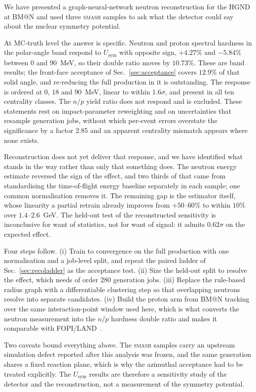 \documentclass[aps,prc,twocolumn,superscriptaddress,showpacs,%
               nofootinbib,floatfix,longbibliography]{revtex4-2}
\makeatletter
\newcommand{\Usym}{U_{\text{sym}}}
\newcommand{\HGND}{HGND}
\newcommand{\BMN}{BM@N}
\newcommand{\SMASH}{\textsc{smash}}
\makeatother
\begin{document}
We have presented a graph-neural-network neutron reconstruction for the
\HGND{} at \BMN{} and used three \SMASH{} samples to ask what the
detector could say about the nuclear symmetry potential.

At MC-truth level the answer is specific.  Neutron and proton spectral
hardness in the polar-angle band respond to $\Usym{}$ with opposite
sign, $+4.27\%$ and $-5.84\%$ between $0$ and $90$~MeV, so their double
ratio moves by $10.73\%$.  These are band results; the front-face
acceptance of Sec.~\ref{sec:acceptance} covers $12.9\%$ of that solid
angle, and re-reducing the full production in it is outstanding.  The response is ordered at $0$, $18$ and
$90$~MeV, linear to within $1.6\sigma$, and present in all ten
centrality classes.  The $n/p$ yield ratio does not respond and is
excluded.  These statements rest on impact-parameter reweighting and on
uncertainties that resample generation jobs, without which per-event
errors overstate the significance by a factor 2.85 and an apparent
centrality mismatch appears where none exists.

Reconstruction does not yet deliver that response, and we have
identified what stands in the way rather than only that something does.
The neutron energy estimate reversed the sign of the effect, and two
thirds of that came from standardising the time-of-flight energy
baseline separately in each sample; one common normalisation removes
it.  The remaining gap is the estimator itself, whose linearity a
partial retrain already improves from $+50$--$60\%$ to within $10\%$
over $1.4$--$2.6$~GeV.  The held-out test of the reconstructed
sensitivity is inconclusive for want of statistics, not for want of
signal: it admits $0.62\sigma$ on the expected effect.

Four steps follow.  (i) Train to convergence on the full production
with one normalisation and a job-level split, and repeat the paired
ladder of Sec.~\ref{sec:recoladder} as the acceptance test.  (ii) Size
the held-out split to resolve the effect, which needs of order 280
generation jobs.  (iii) Replace the rule-based radius graph with a
differentiable clustering step so that overlapping neutrons resolve
into separate candidates.  (iv) Build the proton arm from \BMN{}
tracking over the same interaction-point window used here, which is
what converts the neutron measurement into the $n/p$ hardness double
ratio and makes it comparable with FOPI/LAND~\cite{FOPI_LAND1,
FOPI_LAND2}.

Two caveats bound everything above.  The \SMASH{} samples carry an
upstream simulation defect reported after this analysis was frozen, and
the same generation shares a fixed reaction plane, which is why the
azimuthal acceptance had to be treated explicitly.  The $\Usym{}$
results are therefore a sensitivity study of the detector and the
reconstruction, not a measurement of the symmetry potential.
\end{document}
